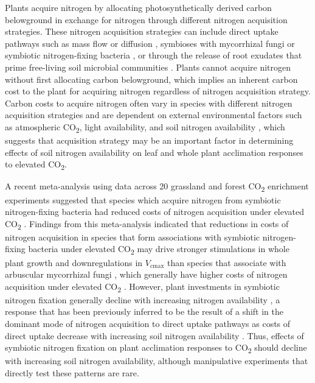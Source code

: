 Plants acquire nitrogen by allocating photosynthetically derived carbon belowground in exchange for nitrogen through different nitrogen acquisition strategies. These nitrogen acquisition strategies can include direct uptake pathways such as mass flow or diffusion , symbioses with mycorrhizal fungi or symbiotic nitrogen-fixing bacteria , or through the release of root exudates that prime free-living soil microbial communities . Plants cannot acquire nitrogen without first allocating carbon belowground, which implies an inherent carbon cost to the plant for acquiring nitrogen regardless of nitrogen acquisition strategy. Carbon costs to acquire nitrogen often vary in species with different nitrogen acquisition strategies and are dependent on external environmental factors such as atmospheric CO\textsubscript{2}, light availability, and soil nitrogen availability , which suggests that acquisition strategy may be an important factor in determining effects of soil nitrogen availability on leaf and whole plant acclimation responses to elevated CO\textsubscript{2}.

A recent meta-analysis using data across 20 grassland and forest CO\textsubscript{2} enrichment experiments suggested that species which acquire nitrogen from symbiotic nitrogen-fixing bacteria had reduced costs of nitrogen acquisition under elevated CO\textsubscript{2} . Findings from this meta-analysis indicated that reductions in costs of nitrogen acquisition in species that form associations with symbiotic nitrogen-fixing bacteria under elevated CO\textsubscript{2} may drive stronger stimulations in whole plant growth and downregulations in $V_\mathrm{cmax}$ than species that associate with arbuscular mycorrhizal fungi , which generally have higher costs of nitrogen acquisition under elevated CO\textsubscript{2} . However, plant investments in symbiotic nitrogen fixation generally decline with increasing nitrogen availability , a response that has been previously inferred to be the result of a shift in the dominant mode of nitrogen acquisition to direct uptake pathways as costs of direct uptake decrease with increasing soil nitrogen availability . Thus, effects of symbiotic nitrogen fixation on plant acclimation responses to CO\textsubscript{2} should decline with increasing soil nitrogen availability, although manipulative experiments that directly test these patterns are rare.

